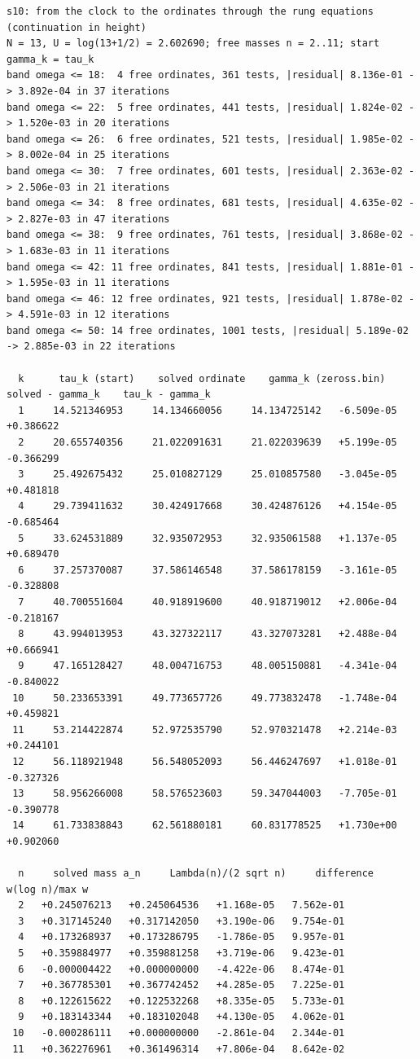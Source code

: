 \documentclass[11pt,reqno]{amsart}
\numberwithin{equation}{section}
\theoremstyle{plain}
\theoremstyle{definition}
\theoremstyle{remark}
\begin{document}
\begin{lstlisting}[style=out]
s10: from the clock to the ordinates through the rung equations (continuation in height)
N = 13, U = log(13+1/2) = 2.602690; free masses n = 2..11; start gamma_k = tau_k
band omega <= 18:  4 free ordinates, 361 tests, |residual| 8.136e-01 -> 3.892e-04 in 37 iterations
band omega <= 22:  5 free ordinates, 441 tests, |residual| 1.824e-02 -> 1.520e-03 in 20 iterations
band omega <= 26:  6 free ordinates, 521 tests, |residual| 1.985e-02 -> 8.002e-04 in 25 iterations
band omega <= 30:  7 free ordinates, 601 tests, |residual| 2.363e-02 -> 2.506e-03 in 21 iterations
band omega <= 34:  8 free ordinates, 681 tests, |residual| 4.635e-02 -> 2.827e-03 in 47 iterations
band omega <= 38:  9 free ordinates, 761 tests, |residual| 3.868e-02 -> 1.683e-03 in 11 iterations
band omega <= 42: 11 free ordinates, 841 tests, |residual| 1.881e-01 -> 1.595e-03 in 11 iterations
band omega <= 46: 12 free ordinates, 921 tests, |residual| 1.878e-02 -> 4.591e-03 in 12 iterations
band omega <= 50: 14 free ordinates, 1001 tests, |residual| 5.189e-02 -> 2.885e-03 in 22 iterations

  k      tau_k (start)    solved ordinate    gamma_k (zeross.bin)   solved - gamma_k    tau_k - gamma_k
  1     14.521346953     14.134660056     14.134725142   -6.509e-05   +0.386622
  2     20.655740356     21.022091631     21.022039639   +5.199e-05   -0.366299
  3     25.492675432     25.010827129     25.010857580   -3.045e-05   +0.481818
  4     29.739411632     30.424917668     30.424876126   +4.154e-05   -0.685464
  5     33.624531889     32.935072953     32.935061588   +1.137e-05   +0.689470
  6     37.257370087     37.586146548     37.586178159   -3.161e-05   -0.328808
  7     40.700551604     40.918919600     40.918719012   +2.006e-04   -0.218167
  8     43.994013953     43.327322117     43.327073281   +2.488e-04   +0.666941
  9     47.165128427     48.004716753     48.005150881   -4.341e-04   -0.840022
 10     50.233653391     49.773657726     49.773832478   -1.748e-04   +0.459821
 11     53.214422874     52.972535790     52.970321478   +2.214e-03   +0.244101
 12     56.118921948     56.548052093     56.446247697   +1.018e-01   -0.327326
 13     58.956266008     58.576523603     59.347044003   -7.705e-01   -0.390778
 14     61.733838843     62.561880181     60.831778525   +1.730e+00   +0.902060

  n     solved mass a_n     Lambda(n)/(2 sqrt n)     difference     w(log n)/max w
  2   +0.245076213   +0.245064536   +1.168e-05   7.562e-01
  3   +0.317145240   +0.317142050   +3.190e-06   9.754e-01
  4   +0.173268937   +0.173286795   -1.786e-05   9.957e-01
  5   +0.359884977   +0.359881258   +3.719e-06   9.423e-01
  6   -0.000004422   +0.000000000   -4.422e-06   8.474e-01
  7   +0.367785301   +0.367742452   +4.285e-05   7.225e-01
  8   +0.122615622   +0.122532268   +8.335e-05   5.733e-01
  9   +0.183143344   +0.183102048   +4.130e-05   4.062e-01
 10   -0.000286111   +0.000000000   -2.861e-04   2.344e-01
 11   +0.362276961   +0.361496314   +7.806e-04   8.642e-02
\end{lstlisting}
\end{document}
